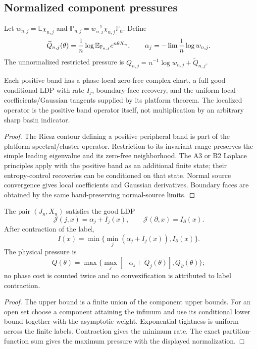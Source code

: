 \subsection{Normalized component pressures}

Let $w_{n,j}=\mathbb E\chi_{n,j}$ and
$\mathbb P_{n,j}=w_{n,j}^{-1}\chi_{n,j}\mathbb P_n$.  Define
\[
 \widetilde Q_{n,j}(\theta)
 ={1\over n}\log\mathbb E_{\mathbb P_{n,j}}e^{n\theta X_n},
 \qquad
 \alpha_j=-\lim {1\over n}\log w_{n,j}.
\]
The unnormalized restricted pressure is
$Q_{n,j}=n^{-1}\log w_{n,j}+\widetilde Q_{n,j}$.

\begin{theorem}
\label{thm:r12-d1-component}
Each positive band has a phase-local zero-free complex chart, a full good
conditional LDP with rate $I_j$, boundary-face recovery, and the uniform local
coefficients/Gaussian tangents supplied by its platform theorem.  The
localized operator is the positive band operator itself, not multiplication
by an arbitrary sharp basin indicator.
\end{theorem}

\begin{proof}
The Riesz contour defining a positive peripheral band is part of the platform
spectral/cluster operator.  Restriction to its invariant range preserves the
simple leading eigenvalue and its zero-free neighborhood.  The A3 or B2
Laplace principles apply with the positive band as an additional finite state;
their entropy-control recoveries can be conditioned on that state.  Normal
source convergence gives local coefficients and Gaussian derivatives.
Boundary faces are obtained by the same band-preserving normal-source limits.
\end{proof}

\begin{theorem}
\label{thm:r12-d1-mixture}
The pair $(J_n,X_n)$ satisfies the good LDP
\[
 \mathcal J(j,x)=\alpha_j+I_j(x),
 \qquad
 \mathcal J(\partial,x)=I_\partial(x).
\]
After contraction of the label,
\[
 I(x)=\min\bigl\{\min_j(\alpha_j+I_j(x)),I_\partial(x)\bigr\}.
\]
The physical pressure is
\[
 Q(\theta)=\max\bigl\{
 \max_j[-\alpha_j+\widetilde Q_j(\theta)],
 Q_\partial(\theta)\bigr\};
\]
no phase cost is counted twice and no convexification is attributed to label
contraction.
\end{theorem}

\begin{proof}
The upper bound is a finite union of the component upper bounds.  For an open
set choose a component attaining the infimum and use its conditional lower
bound together with the asymptotic weight.  Exponential tightness is uniform
across the finite labels.  Contraction gives the minimum rate.  The exact
partition-function sum gives the maximum pressure with the displayed
normalization.
\end{proof}

